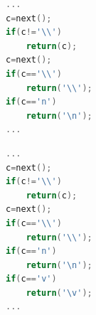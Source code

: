\documentclass[CJK]{beamer}
\begin{document}
\begin{CJK*}{UTF8}{gbsn}
{\tiny
\begin{lstlisting}[language=C,caption=Stage II 2.1,keywordstyle=\color{blue!70}, commentstyle=\color{red!50!green!50!blue!50}, frame=shadowbox, rulesepcolor=\color{red!20!green!20!blue!20}]
...
c=next();
if(c!='\\')
	return(c);
c=next();
if(c=='\\')
	return('\\');
if(c=='n')
	return('\n');
...
\end{lstlisting}
\begin{lstlisting}[language=C,caption=Stage II 2.2,keywordstyle=\color{blue!70}, commentstyle=\color{red!50!green!50!blue!50}, frame=shadowbox, rulesepcolor=\color{red!20!green!20!blue!20}]
...
c=next();
if(c!='\\')
	return(c);
c=next();
if(c=='\\')
	return('\\');
if(c=='n')
	return('\n');
if(c=='v')
	return('\v');
...
\end{lstlisting}
}


\end{CJK*}
\end{document}
